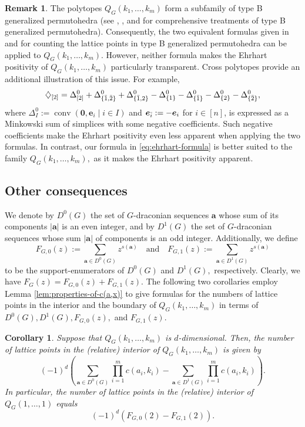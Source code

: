 \documentclass[11pt,a4paper]{article}
\newcommand{\vct}[1]{\boldsymbol{#1}}
\newcommand{\conv}{\operatorname{conv}}
\newcommand{\1}{\mathbf{1}}
\theoremstyle{plain}
\newtheorem{corollary}[theorem]{Corollary}
\theoremstyle{definition}
\newtheorem{remark}[theorem]{Remark}
\begin{document}
\begin{remark}\label{rem:other-formulas}
    The polytopes $Q_G(k_1, \dots, k_m)$ form a subfamily of type B generalized permutohedra (see \cite{Euretall2024}, \cite{Bastidas2021}, and \cite{thawinrak2025AtoB} for comprehensive treatments of type B generalized permutohedra). Consequently, the two equivalent formulas given in \cite[Theorem A]{Euretall2024} and \cite[Corollary 4.11]{thawinrak2025AtoB} for counting the lattice points in type B generalized permutohedra can be applied to $Q_G(k_1, \dots,k_m).$ However, neither formula makes the Ehrhart positivity of $Q_G(k_1, \dots,k_m)$ particularly transparent. Cross polytopes provide an additional illustration of this issue. For example,
\[
\diamondsuit_{[2]}
=
\Delta^0_{[2]}
+\Delta^0_{\{\Bar{1},\Bar{2}\}}
+\Delta^0_{\{\Bar{1},2\}}
-\Delta^0_{\{1\}}
-\Delta^0_{\{\Bar{1}\}}
-\Delta^0_{\{2\}}
-\Delta^0_{\{\Bar{2}\}},
\]
where $\Delta^0_I:=\conv(\vct{0},\vct{e}_i\mid i\in I)$ and $\vct{e}_{\Bar{i}}:=-\vct{e}_i$ for $i\in[n]$, is expressed as a Minkowski sum of simplices with some negative coefficients. Such negative coefficients make the Ehrhart positivity even less apparent when applying the two formulas. In contrast, our formula in \eqref{eq:ehrhart-formula} is better suited to the family $Q_G(k_1,\dots,k_m),$ as it makes the Ehrhart positivity apparent.
\end{remark}

\subsection{Other consequences}

We denote by $D^0(G)$ the set of $G$-draconian sequences $\vct{a}$ whose sum of its components $|\vct{a}|$ is an even integer, and by $D^1(G)$ the set of $G$-draconian sequences whose sum $|\vct{a}|$ of components is an odd integer. Additionally, we define
\[F_{G,0}(z):= \sum_{\vct{a} \in D^0(G)}z^{s(\vct{a})} \quad \text{and} \quad F_{G,1}(z):= \sum_{\vct{a} \in D^1(G)}z^{s(\vct{a})}\]
to be the support-enumerators of $D^0(G)$ and $D^1(G),$ respectively. Clearly, we have $F_G(z) = F_{G,0}(z) + F_{G,1}(z)$. The following two corollaries employ Lemma \ref{lem:properties-of-c(a,x)} to give formulas for the numbers of lattice points in the interior and the boundary of $Q_G(k_1, \dots, k_m)$ in terms of $D^0(G), D^1(G), F_{G,0}(z),$ and $F_{G,1}(z).$ 

\begin{corollary}
Suppose that $Q_G(k_1,\ldots,k_m)$ is $d$-dimensional. Then, the number of lattice points in the (relative) interior of $Q_G(k_1,\ldots,k_m)$ is given by
\begin{equation}
(-1)^d\left(
\sum_{\vct{a}\in D^0(G)}\prod_{i=1}^m c(a_i,k_i)
-
\sum_{\vct{a}\in D^1(G)}\prod_{i=1}^m c(a_i,k_i)
\right).
\label{eq:interior}
\end{equation}
In particular, the number of lattice points in the (relative) interior of $Q_G(1,\dots, 1)$ equals $$(-1)^d(F_{G,0}(2)-F_{G,1}(2)).$$
\end{corollary}
\end{document}
